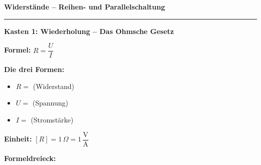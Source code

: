 \documentclass[11pt, a4paper]{article}
\newcommand{\thema}{Widerstände – Reihen- und Parallelschaltung}
\newcommand{\luecke}[1]{\underline{\hspace{#1}}}
\begin{document}

\begin{center}
    {\Large\bfseries\textcolor{fachfarbe}{\thema}}\\[0.2em]
\end{center}
\vspace{-0.5em}
\hrule
\vspace{0.8em}


\begin{merkkasten}
\textbf{Kasten 1: Wiederholung – Das Ohmsche Gesetz}

\vspace{0.3em}
\begin{minipage}[t]{0.55\linewidth}
\textbf{Formel:} \quad $R = \dfrac{U}{I}$

\vspace{0.5em}
\textbf{Die drei Formen:}
\begin{itemize}[leftmargin=1.5em, itemsep=2pt]
    \item $R = $ \luecke{1.5cm} (Widerstand)
    \item $U = $ \luecke{1.5cm} (Spannung)
    \item $I = $ \luecke{1.5cm} (Stromstärke)
\end{itemize}

\vspace{0.3em}
\textbf{Einheit:} $[R] = 1\,\Omega = 1\,\dfrac{\text{V}}{\text{A}}$
\end{minipage}%
\begin{minipage}[t]{0.45\linewidth}
\begin{center}
\textbf{Formeldreieck:}

\vspace{0.3em}
\end{center}
\end{minipage}
\end{merkkasten}
\end{document}
